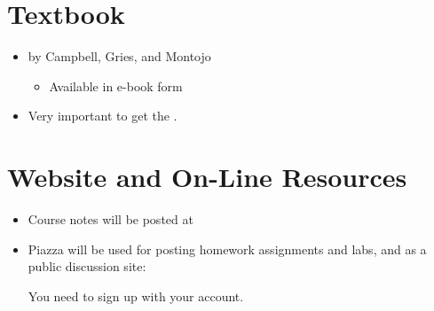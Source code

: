 \documentclass[letterpaper,10pt,english]{sphinxmanual}
\begin{document}
\section{Textbook}
\label{\detokenize{lecture_notes/lec01_intro:textbook}}\begin{itemize}
\item {} 
 by Campbell, Gries, and Montojo
\begin{itemize}
\item {} 
Available in e-book form

\end{itemize}

\item {} 
Very important to get the .

\end{itemize}


\section{Website and On-Line Resources}
\label{\detokenize{lecture_notes/lec01_intro:website-and-on-line-resources}}\begin{itemize}
\item {} 
Course notes will be posted at
\begin{quote}

\end{quote}

\item {} 
Piazza will be used for posting homework assignments and labs, and as a
public discussion site:
\begin{quote}

\end{quote}

You need to sign up with your  account.

\end{itemize}
\end{document}
